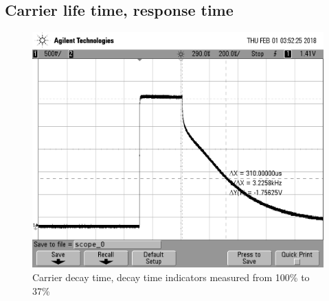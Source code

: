 \clearpage

\subsection{Carrier life time, response time }

\begin{figure}[h]
    \centering
    \includegraphics[width=.75\linewidth]{figures/carrier.png}
    \caption{Carrier decay time, decay time indicators measured from 100\% to 37\%}
    \label{fig:carrier}
\end{figure}